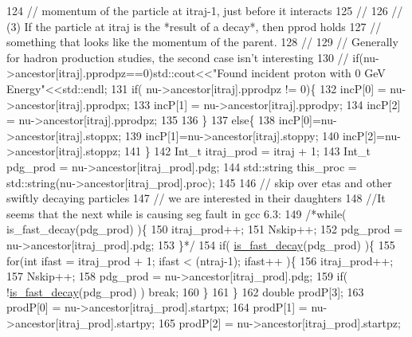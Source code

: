\begin{DoxyCode}
124       \textcolor{comment}{// momentum of the particle at itraj-1, just before it interacts}
125       \textcolor{comment}{//}
126       \textcolor{comment}{// (3) If the particle at itraj is the *result of a decay*, then pprod holds}
127       \textcolor{comment}{// something that looks like the momentum of the parent.}
128       \textcolor{comment}{//}
129       \textcolor{comment}{// Generally for hadron production studies, the second case isn't interesting}
130     \textcolor{comment}{//  if(nu->ancestor[itraj].pprodpz==0)std::cout<<"Found incident proton with 0 GeV Energy"<<std::endl;}
131       \textcolor{keywordflow}{if}( nu->ancestor[itraj].pprodpz != 0)\{
132         incP[0] = nu->ancestor[itraj].pprodpx;
133         incP[1] = nu->ancestor[itraj].pprodpy;
134         incP[2] = nu->ancestor[itraj].pprodpz;
135       
136       \}
137       \textcolor{keywordflow}{else}\{
138         incP[0]=nu->ancestor[itraj].stoppx;
139         incP[1]=nu->ancestor[itraj].stoppy;
140         incP[2]=nu->ancestor[itraj].stoppz;
141       \}
142       Int\_t itraj\_prod = itraj + 1;
143       Int\_t pdg\_prod   = nu->ancestor[itraj\_prod].pdg;
144       std::string this\_proc = std::string(nu->ancestor[itraj\_prod].proc);
145       
146       \textcolor{comment}{// skip over etas and other swiftly decaying particles}
147       \textcolor{comment}{// we are interested in their daughters}
148       \textcolor{comment}{//It seems that the next while is causing seg fault in gcc 6.3:}
149       \textcolor{comment}{/*while( is\_fast\_decay(pdg\_prod) )\{}
150 \textcolor{comment}{        itraj\_prod++;}
151 \textcolor{comment}{        Nskip++;}
152 \textcolor{comment}{        pdg\_prod = nu->ancestor[itraj\_prod].pdg;}
153 \textcolor{comment}{        \}*/}
154       \textcolor{keywordflow}{if}( \hyperlink{class_neutrino_flux_reweight_1_1_interaction_chain_data_a4297c9ba702c5c205e9624b8bdcc6471}{is\_fast\_decay}(pdg\_prod) )\{
155         \textcolor{keywordflow}{for}(\textcolor{keywordtype}{int} ifast = itraj\_prod + 1; ifast < (ntraj-1); ifast++ )\{
156           itraj\_prod++;
157           Nskip++;
158           pdg\_prod = nu->ancestor[itraj\_prod].pdg;
159           \textcolor{keywordflow}{if}( !\hyperlink{class_neutrino_flux_reweight_1_1_interaction_chain_data_a4297c9ba702c5c205e9624b8bdcc6471}{is\_fast\_decay}(pdg\_prod) ) \textcolor{keywordflow}{break};      
160         \}
161       \}
162       \textcolor{keywordtype}{double} prodP[3];
163       prodP[0] = nu->ancestor[itraj\_prod].startpx;
164       prodP[1] = nu->ancestor[itraj\_prod].startpy;
165       prodP[2] = nu->ancestor[itraj\_prod].startpz;

\end{DoxyCode}
